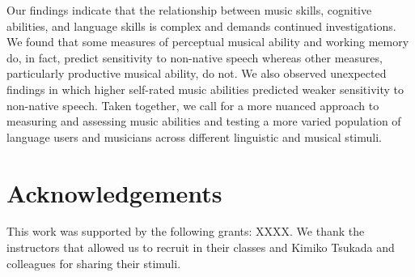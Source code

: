 \documentclass[a4paper]{article}
\begin{document}
Our findings indicate that the relationship between music skills, cognitive abilities, and language skills is complex and demands continued investigations. We found that some measures of perceptual musical ability and working memory do, in fact, predict sensitivity to non-native speech whereas other measures, particularly productive musical ability, do not. We also observed unexpected findings in which higher self-rated music abilities predicted weaker sensitivity to non-native speech. Taken together, we call for a more nuanced approach to measuring and assessing music abilities and testing a more varied population of language users and musicians across different linguistic and musical stimuli.

\section{Acknowledgements}

This work was supported by the following grants: XXXX. We thank the instructors that allowed us to recruit in their classes and Kimiko Tsukada and colleagues for sharing their stimuli.



\end{document}
